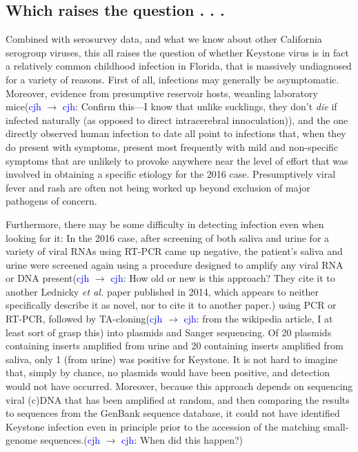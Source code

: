 \documentclass[12pt]{article}
\newcommand{\cjh}{\textcolor{blue}{cjh}}
\newcommand{\msg}[3]{(#1 $\rightarrow$ #2: #3)}
\newcommand{\mcc}[1]{\msg\cjh\cjh{#1}}
\begin{document}
        \subsection{Which raises the question . . .}
            \label{raises-the-question}
            Combined with serosurvey data, and what we know about other California serogroup viruses, this all raises the question of whether Keystone virus is in fact a relatively common childhood infection in Florida, that is massively undiagnosed for a variety of reasons. First of all, infections may generally be asymptomatic. Moreover, evidence from presumptive reservoir hosts, weanling laboratory mice\mcc{Confirm this---I know that unlike sucklings, they don't \textit{die} if infected naturally (as opposed to direct intracerebral innoculation)}, and the one directly observed human infection to date all point to infections that, when they do present with symptoms, present most frequently with mild and non-specific symptoms that are unlikely to provoke anywhere near the level of effort that was involved in obtaining a specific etiology for the 2016 case. Presumptively viral fever and rash are often not being worked up beyond exclusion of major pathogens of concern.
            
            Furthermore, there may be some difficulty in detecting infection even when looking for it: In the 2016 case, after screening of both saliva and urine for a variety of viral RNAs using RT-PCR came up negative, the patient's saliva and urine were screened again using a procedure designed to amplify any viral RNA or DNA present\mcc{How old or new is this approach? They cite it to another Lednicky \textit{et al.} paper published in 2014, which appears to neither specifically describe it as novel, nor to cite it to another paper.} using PCR or RT-PCR, followed by TA-cloning\mcc{from the wikipedia article, I at least sort of grasp this} into plasmids and Sanger sequencing. Of 20 plasmids containing inserts amplified from urine and 20 containing inserts amplified from saliva, only 1 (from urine) was positive for Keystone. It is not hard to imagine that, simply by chance, no plasmids would have been positive, and detection would not have occurred. Moreover, because this approach depends on sequencing viral (c)DNA that has been amplified at random, and then comparing the results to sequences from the GenBank sequence database, it could not have identified Keystone infection even in principle prior to the accession of the matching small-genome sequences.\mcc{When did this happen?}
\end{document}
